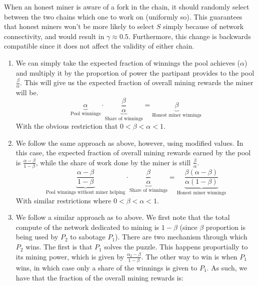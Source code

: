 \documentclass[12pt]{exam}
\newcommand{\Q}[1]{\question{\large{\textbf{#1}}}}
\begin{document}
\begin{questions}
\newpage
\Q{Problem 3}
\begin{solution}
  When an honest miner is aware of a fork in the chain, it should randomly select between the two chains which one to work on (uniformly so). This guarantees that honest miners won't be more likely to select $S$ simply because of network connectivity, and would result in $\gamma \approx 0.5$. Furthermore, this change is backwards compatible since it does not affect the validity of either chain.
\end{solution}

\newpage
\Q{Problem 4}
\begin{solution}
  \begin{enumerate}[label=\textbf{\alph*.}]
    \item
      We can simply take the expected fraction of winnings the pool achieves ($\alpha$) and multiply it by the proportion of power the partipant provides to the pool $\frac{\beta}{\alpha}$. This will give us the expected fraction of overall mining rewards the miner will be.
      \[
        \underbrace{\alpha}_{\text{Pool winnings}} \cdot \underbrace{\frac{\beta}{\alpha}}_{\text{Share of winnings}} = \underbrace{\beta}_{\text{Honest miner winnings}}
      \]
      With the obvious restriction that $0 < \beta < \alpha < 1$.
    \item
      We follow the same approach as above, however, using modified values. In this case, the expected fraction of overall mining rewards earned by the pool is $\frac{\alpha - \beta}{1 - \beta}$, while the share of work done by the miner is still $\frac{\beta}{\alpha}$.
      \[
         \underbrace{\frac{\alpha - \beta}{1-\beta}}_{\text{Pool winnings without miner helping}} \cdot \underbrace{\frac{\beta}{\alpha}}_{\text{Share of winnings}} = \underbrace{\frac{\beta(\alpha - \beta)}{{\alpha(1-\beta)}}}_{\text{Honest miner winnings}}
      \]
      With similar restrictions where $0 < \beta < \alpha < 1$.
    \item
      We follow a similar approach as to above. We first note that the total compute of the network dedicated to mining is $1 -\beta$ (since $\beta$ proportion is being used by $P_2$ to sabotage $P_1$). There are two mechanism through which $P_2$ wins. The first is that $P_1$ solves the puzzle. This happens proportially to its mining power, which is given by $\frac{\alpha_2 - \beta}{1 - \beta}$. The other way to win is when $P_1$ wins, in which case only a share of the winnings is given to $P_1$. As such, we have that the fraction of the overall mining rewards is:

\end{enumerate}
\end{solution}
\end{questions}
\end{document}
